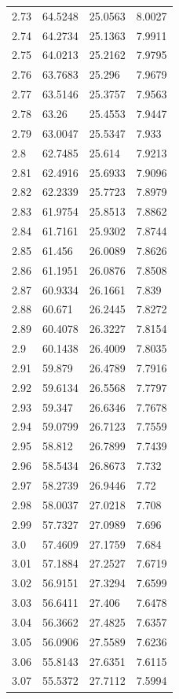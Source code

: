 \begin{tabular}{llll}
2.73 & 64.5248 & 25.0563 & 8.0027 \\
2.74 & 64.2734 & 25.1363 & 7.9911 \\
2.75 & 64.0213 & 25.2162 & 7.9795 \\
2.76 & 63.7683 & 25.296 & 7.9679 \\
2.77 & 63.5146 & 25.3757 & 7.9563 \\
2.78 & 63.26 & 25.4553 & 7.9447 \\
2.79 & 63.0047 & 25.5347 & 7.933 \\
2.8 & 62.7485 & 25.614 & 7.9213 \\
2.81 & 62.4916 & 25.6933 & 7.9096 \\
2.82 & 62.2339 & 25.7723 & 7.8979 \\
2.83 & 61.9754 & 25.8513 & 7.8862 \\
2.84 & 61.7161 & 25.9302 & 7.8744 \\
2.85 & 61.456 & 26.0089 & 7.8626 \\
2.86 & 61.1951 & 26.0876 & 7.8508 \\
2.87 & 60.9334 & 26.1661 & 7.839 \\
2.88 & 60.671 & 26.2445 & 7.8272 \\
2.89 & 60.4078 & 26.3227 & 7.8154 \\
2.9 & 60.1438 & 26.4009 & 7.8035 \\
2.91 & 59.879 & 26.4789 & 7.7916 \\
2.92 & 59.6134 & 26.5568 & 7.7797 \\
2.93 & 59.347 & 26.6346 & 7.7678 \\
2.94 & 59.0799 & 26.7123 & 7.7559 \\
2.95 & 58.812 & 26.7899 & 7.7439 \\
2.96 & 58.5434 & 26.8673 & 7.732 \\
2.97 & 58.2739 & 26.9446 & 7.72 \\
2.98 & 58.0037 & 27.0218 & 7.708 \\
2.99 & 57.7327 & 27.0989 & 7.696 \\
3.0 & 57.4609 & 27.1759 & 7.684 \\
3.01 & 57.1884 & 27.2527 & 7.6719 \\
3.02 & 56.9151 & 27.3294 & 7.6599 \\
3.03 & 56.6411 & 27.406 & 7.6478 \\
3.04 & 56.3662 & 27.4825 & 7.6357 \\
3.05 & 56.0906 & 27.5589 & 7.6236 \\
3.06 & 55.8143 & 27.6351 & 7.6115 \\
3.07 & 55.5372 & 27.7112 & 7.5994 \\

\end{tabular}
